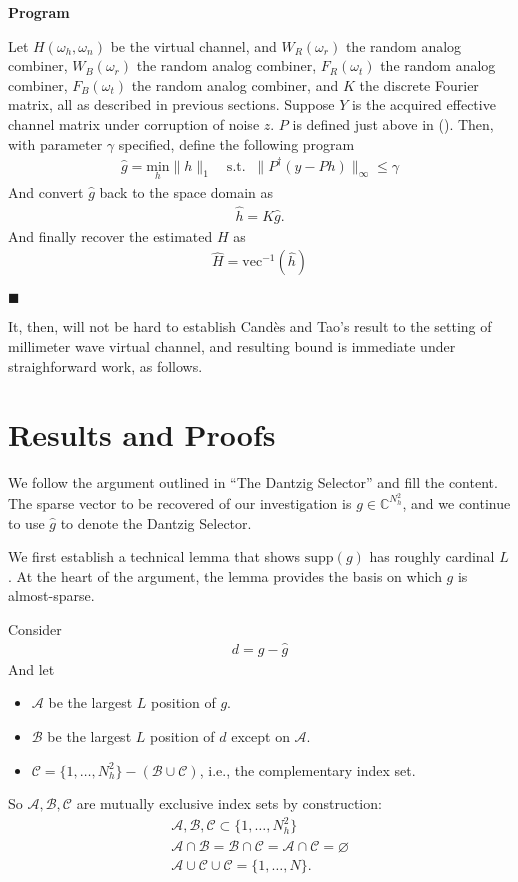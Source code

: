 \documentclass[12pt]{article}
\newcommand{\MB}[1]{\mathbb{#1}}
\newcommand{\MC}[1]{\mathcal{#1}}
\newcommand{\RM}[1]{\mathrm{#1}}
\newcounter{NumResult}
\newcommand{\myCount}
{
   \stepcounter{NumResult}
   \textbf{\arabic{NumResult}}
}
\newcommand {\Result} [2]
{
   \bigskip
   \myCount \textbf{#1} \par
   {#2} \par
   \hfill \(\blacksquare\)
   \bigskip
}
\begin{document}
\Result
{Program}
{
Let \(H(\omega_h, \omega_n)\) be the virtual channel, and \(W_R(\omega_r)\) the random analog combiner, \(W_B(\omega_r)\) the random analog combiner, \(F_R(\omega_t)\) the random analog combiner, \(F_B(\omega_t)\) the random analog combiner, and \(K\) the discrete Fourier matrix, all as described in previous sections.
Suppose \(Y\) is the acquired effective channel matrix under corruption of noise \(z\).
\(P\) is defined just above in ().
Then, with parameter \(\gamma\) specified, define the following program
\begin{gather}
\hat{g}
=\underset {{h}} {\RM{min}} \|h\|_1 \quad
\RM{s.t.}\;\; \|P^\dagger (y -P h)\|_\infty \leq \gamma
\end{gather}
And convert \(\hat{g}\) back to the space domain as
\begin{gather}
\hat{h}
=K \hat{g}.
\end{gather}
And finally recover the estimated \(H\) as
\begin{gather}
\hat{H} =\RM{vec}^{-1} (\hat{h})
\end{gather}
}

It, then, will not be hard to establish Cand\`es and Tao's result to the setting of millimeter wave virtual channel, and resulting bound is immediate under straighforward work, as follows.

\section{Results and Proofs}

We follow the argument outlined in ``The Dantzig Selector'' and fill the content.
The sparse vector to be recovered of our investigation is \(g \in \MB{C}^{N_h^2}\), and we continue to use \(\hat{g}\) to denote the Dantzig Selector.

We first establish a technical lemma that shows \(\RM{supp}(g)\) has roughly cardinal \(L\).
At the heart of the argument, the lemma provides the basis on which \(g\) is almost-sparse.

Consider
\begin{gather}
d =g -\hat{g}
\end{gather}
And let
\begin{itemize}
\item \(\MC{A}\) be the largest \(L\) position of \(g\).
\item \(\MC{B}\) be the largest \(L\) position of \(d\) except on \(\MC{A}\).
\item \(\MC{C} =\{1, \dotsc, N_h^2\} -( \MC{B} \cup \MC{C} )\), i.e., the complementary index set.
\end{itemize}
So \(\MC{A}, \MC{B}, \MC{C}\) are mutually exclusive index sets by construction:
\begin{gather}
\MC{A}, \MC{B}, \MC{C} \subset \{1, \dotsc, N_h^2\} \\
   \MC{A} \cap \MC{B} =\MC{B} \cap \MC{C} =\MC{A} \cap \MC{C} =\varnothing \\
\MC{A} \cup \MC{C} \cup \MC{C} =\{1, \dotsc, N\}.
\end{gather}
\end{document}
